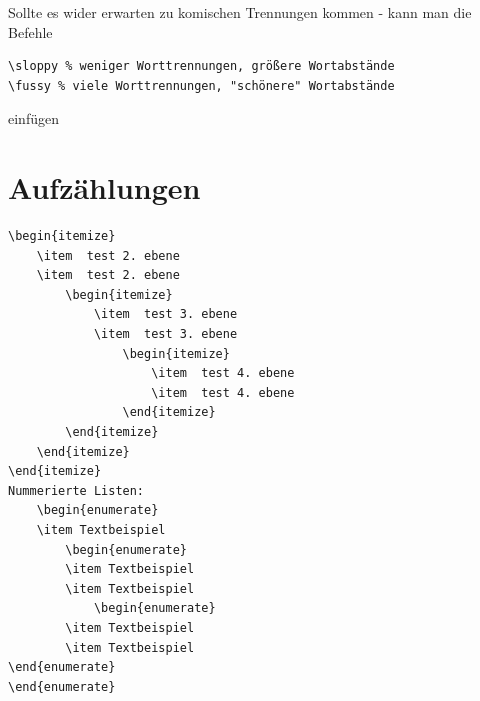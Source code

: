 \documentclass{like}
\begin{document}
Sollte es wider erwarten zu komischen Trennungen kommen - kann man die Befehle 
\begin{verbatim}
\sloppy % weniger Worttrennungen, größere Wortabstände
\fussy % viele Worttrennungen, "schönere" Wortabstände
\end{verbatim}
einfügen 

\section{Aufzählungen}
\par

\begin{minipage}[t!]{0.38\paperwidth}
\begin{verbatim}
\begin{itemize}
	\item  test 2. ebene
	\item  test 2. ebene
		\begin{itemize}
			\item  test 3. ebene
			\item  test 3. ebene
				\begin{itemize}
					\item  test 4. ebene
					\item  test 4. ebene
				\end{itemize}
		\end{itemize}
	\end{itemize}
\end{itemize}
Nummerierte Listen:
	\begin{enumerate}
	\item Textbeispiel
		\begin{enumerate}
		\item Textbeispiel
		\item Textbeispiel
			\begin{enumerate}
		\item Textbeispiel
		\item Textbeispiel
\end{enumerate}
\end{enumerate}
\end{verbatim}

\end{minipage}\quad
\end{document}
